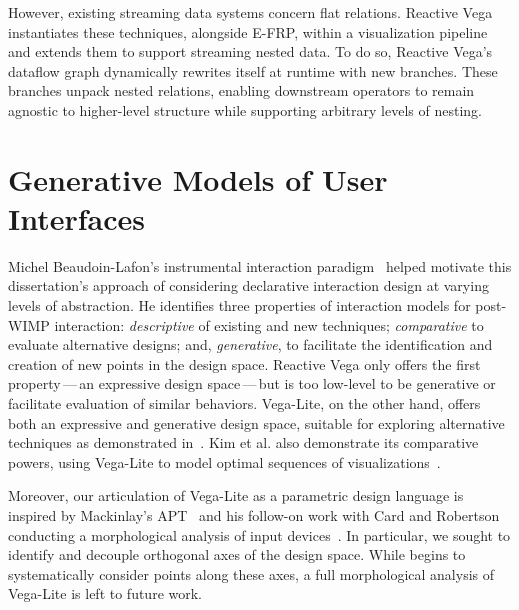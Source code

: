 However, existing streaming data systems concern flat relations. Reactive Vega
instantiates these techniques, alongside E-FRP, within a visualization pipeline
and extends them to support streaming nested data. To do so, Reactive Vega's
dataflow graph dynamically rewrites itself at runtime with new branches. These
branches unpack nested relations, enabling downstream operators to remain
agnostic to higher-level structure while supporting arbitrary levels of nesting.

\vspace{-20pt}

\section{Generative Models of User Interfaces}

\vspace{-7pt}

Michel Beaudoin-Lafon's instrumental interaction
paradigm~\cite{beaudouin:instrumental} helped motivate this dissertation's
approach of considering declarative interaction design at varying levels of
abstraction. He identifies three properties of interaction models for post-WIMP
interaction: \emph{descriptive} of existing and new techniques;
\emph{comparative} to evaluate alternative designs; and, \emph{generative}, to
facilitate the identification and creation of new points in the design space.
Reactive Vega only offers the first property\,---\,an expressive design
space\,---\,but is too low-level to be generative or facilitate evaluation of
similar behaviors. Vega-Lite, on the other hand, offers both an expressive and
generative design space, suitable for exploring alternative techniques as
demonstrated in~. Kim et al. also demonstrate its
comparative powers, using Vega-Lite to model optimal sequences of
visualizations~\cite{kim:graphscape}.

Moreover, our articulation of Vega-Lite as a parametric design language is
inspired by Mackinlay's APT~\cite{mackinlay:apt} and his follow-on work with
Card and Robertson conducting a morphological analysis of input
devices~\cite{card:morphological}. In particular, we sought to identify and
decouple orthogonal axes of the design space. While 
begins to systematically consider points along these axes, a full morphological
analysis of Vega-Lite is left to future work.